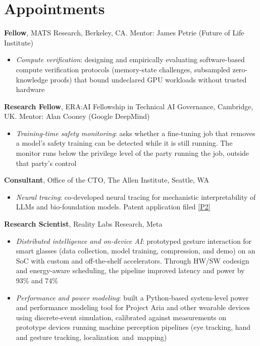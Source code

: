 \documentclass[11pt,letterpaper]{article}
\newcommand{\pref}[1]{\hyperlink{pub:#1}{[#1]}}
\begin{document}
\section{Appointments}

\begin{yearlist}
\item[2026--] \textbf{Fellow}, MATS Research, Berkeley, CA. Mentor: James Petrie (Future of Life Institute)
  \begin{itemize}
  \item \emph{Compute verification}: designing and empirically evaluating software-based compute verification protocols (memory-state challenges, subsampled zero-knowledge proofs) that bound undeclared GPU workloads without trusted hardware
  \end{itemize}
\item[2026--] \textbf{Research Fellow}, ERA:AI Fellowship in Technical AI Governance, Cambridge, UK. Mentor: Alan Cooney (Google DeepMind)
  \begin{itemize}
  \item \emph{Training-time safety monitoring}: asks whether a fine-tuning job that removes a model's safety training can be detected while it is still running. The monitor runs below the privilege level of the party running the job, outside that party's control
  \end{itemize}
\item[2025] \textbf{Consultant}, Office of the CTO, The Allen Institute, Seattle, WA
  \begin{itemize}
  \item \emph{Neural tracing}: co-developed neural tracing for mechanistic interpretability of LLMs and bio-foundation models. Patent application filed \pref{P2}
  \end{itemize}
\item[2022--25] \textbf{Research Scientist}, Reality Labs Research, Meta
  \begin{itemize}
  \item \emph{Distributed intelligence and on-device AI}: prototyped gesture interaction for smart glasses (data collection, model training, compression, and demo) on an SoC with custom and off-the-shelf accelerators. Through HW/SW codesign and energy-aware scheduling, the pipeline improved latency and power by 93\% and 74\%
  \item \emph{Performance and power modeling}: built a Python-based system-level power and performance modeling tool for Project Aria and other wearable devices using discrete-event simulation, calibrated against measurements on prototype devices running machine perception pipelines (eye tracking, hand and gesture tracking, \mbox{localization and mapping})

\end{itemize}
\end{yearlist}
\end{document}
